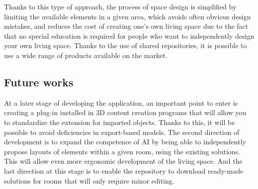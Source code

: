 \documentclass[runningheads]{llncs}
\begin{document}
Thanks to this type of approach, the process of space design is simplified by limiting the available elements in a given area, which avoids often obvious design mistakes, and reduces the cost of creating one's own living space due to the fact that no special education is required for people who want to independently design your own living space. Thanks to the use of shared repositories, it is possible to use a wide range of products available on the market.

\subsection{Future works}
At a later stage of developing the application, an important point to enter is creating a plug-in installed in 3D content creation programs that will allow you to standardize the extension for imported objects. Thanks to this, it will be possible to avoid deficiencies in export-based models. The second direction of development is to expand the competence of AI by being able to independently propose layouts of elements within a given room, using the existing solutions. This will allow even more ergonomic development of the living space. And the last direction at this stage is to enable the repository to download ready-made solutions for rooms that will only require minor editing.
\end{document}
